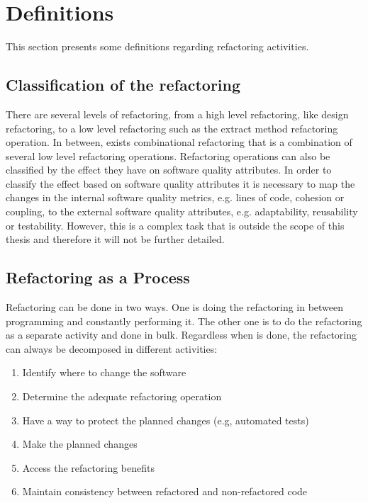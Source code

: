
\section{Definitions}



This section presents some definitions regarding refactoring activities.

\subsection{Classification of the refactoring}
There are several levels of refactoring, from a high level refactoring, like design refactoring, to a low level refactoring such as the extract method refactoring operation. 
In between, exists combinational refactoring that is a combination of several low level refactoring operations.
Refactoring operations can also be classified by the effect they have on software quality attributes.
In order to classify the effect based on software quality attributes it is necessary to map the changes in the internal software quality metrics, e.g. lines of code, cohesion or coupling, to the external software quality attributes, e.g. adaptability, reusability or testability. \cite{elish2011classification}
However, this is a complex task that is outside the scope of this thesis and therefore it will not be further detailed.


\subsection{Refactoring as a Process}
Refactoring can be done in two ways. %
One is doing the refactoring in between programming and constantly performing it. 
The other one is to do the refactoring as a separate activity and done in bulk.
Regardless when is done, the refactoring can always be decomposed in different activities: \cite{erb2010survey}

\begin{enumerate}
 \item Identify where to change the software
 \item Determine the adequate refactoring operation
 \item Have a way to protect the planned changes (e.g, automated tests)
 \item Make the planned changes
 \item Access the refactoring benefits
 \item Maintain consistency between refactored and non-refactored code 
\end{enumerate}


